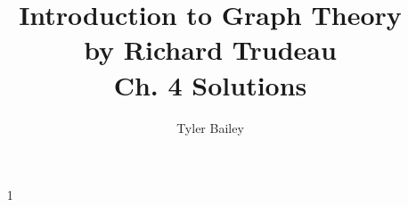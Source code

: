 \documentclass{article}
\begin{document}
\title{%
  Introduction to Graph Theory \\
  \large by Richard Trudeau \\
   Ch. 4 Solutions}
   \author{Tyler Bailey}
\maketitle

\begin{enumerate}

	\item[1]
	
\end{enumerate}
\end{document}
